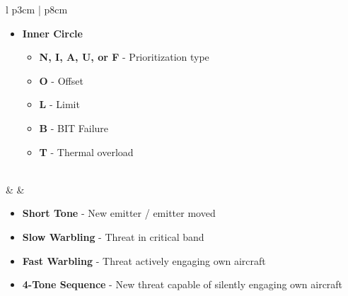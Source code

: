 \documentclass[8pt,usenames,dvipsnames,twoside]{article}
\begin{document}
\begin{center}
\begin{longtable}{l p{3cm} | p{8cm}}
\begin{minipage}[t]{\linewidth}
\begin{itemize}
\begin{itemize}
						\end{itemize}
						\item \textbf{Inner Circle} 
						\begin{itemize}
							\item \textbf{N, I, A, U, or F} - Prioritization type
							\item \textbf{O} - Offset
							\item \textbf{L} - Limit
							\item \textbf{B} - BIT Failure
							\item \textbf{T} - Thermal overload
						\end{itemize}
					\end{itemize}
				\end{minipage} \\
				\midrule
				\textbullet &  & 
				\begin{minipage}[t]{\linewidth}
					\vspace{-7pt}
					\begin{itemize}
						\item \textbf{Short Tone} - New emitter / emitter moved
						\item \textbf{Slow Warbling} - Threat in critical band
						\item \textbf{Fast Warbling} - Threat actively engaging own aircraft
						\item \textbf{4-Tone Sequence} - New threat capable of silently engaging own aircraft 
					\end{itemize}
				\end{minipage} \\
				\bottomrule
			\end{longtable}
		\end{center}
	
		\clearpage
	
\end{document}
